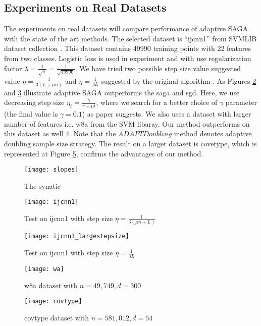 \documentclass{article}
\begin{document}
\subsection{Experiments on Real Datasets}
The experiments on real datasets will compare performance of adaptive SAGA with
the state of the art methods.
 The selected dataset is ``ijcnn1'' from SVMLIB
 dataset collection \cite{REF08a}. This dataset contains 49990 training points
 with 22 features from two classes. Logistic loss is used in experiment and with
 use regularization factor $\lambda = \frac{1}{\sqrt{n}} =
 \frac{1}{\sqrt{49990}}$. We have tried two possible step size value suggested
 value $\eta = \frac{1}{3(L+\mu n )}$ and $\eta = \frac{1}{3L}$ suggested by
 the original algorithm \cite{defazio2014saga}. As Figures \ref{fig:ijcnn1} and 
 \ref{fig:ijcnn1_large} illustrate adaptive SAGA outperforms the saga and sgd. 
 Here, we use decreasing step size $\eta_t = \frac{\gamma}{\gamma+\mu t}$, where
 we search for a better choice of $\gamma$ parameter (the final value is $\gamma
 = 0.1$) as paper \cite{bottou2010large} suggests. 
 We also uses a dataset with larger number of features i.e. w8a from the SVM
 libaray. Our method outperforms on this dataset as well \ref{fig:wa}. Note that
 the $ADAPTDoubling$ method denotes adaptive doubling sample size strategy. The
 result on a larger dataset is covetype, which is represented at Figure
 \ref{fig:covtype}, confirms the advantages of our method. 
 \begin{figure}
\center
\texttt{[image: slopes]} 
\caption{The synatic }
\label{fig:slopes}
\end{figure}

 \begin{figure}
\center
\texttt{[image: ijcnn1]} 
\caption{Test on ijcnn1 with step size $\eta = \frac{1}{3(\mu n + L)}$}
\label{fig:ijcnn1}
\end{figure}
\begin{figure}
\center
\texttt{[image: ijcnn1\_largestepsize]} 
\caption{Test on ijcnn1 with step size $\eta = \frac{1}{3L}$}
\label{fig:ijcnn1_large}
\end{figure}
\begin{figure}
\center
\texttt{[image: wa]} 
\caption{w8a dataset with $n = 49,749, d = 300$}
\label{fig:wa}
\end{figure}
\begin{figure}
\center
\texttt{[image: covtype]} 
\caption{covtype dataset with $n = 581,012, d = 54$}
\label{fig:covtype}
\end{figure}



\end{document}
